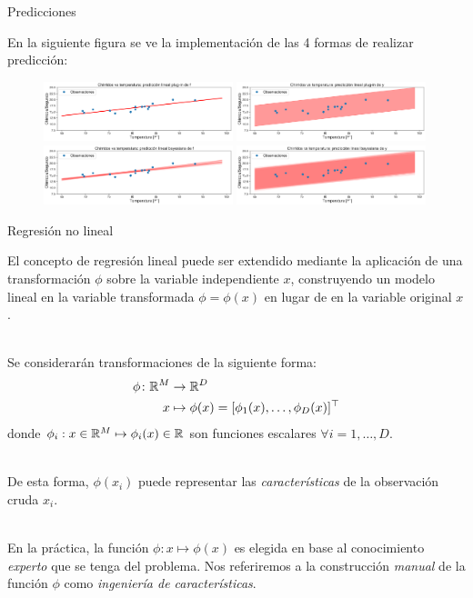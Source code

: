 \documentclass[9pt]{beamer}
\begin{document}
\begin{frame}{Predicciones}

En la siguiente figura se ve la implementación de las 4 formas de realizar predicción:

\begin{figure}[H]
	\centering
	\includegraphics[width=0.49\textwidth]{../img/cap2_chirridos_pred1}
	\includegraphics[width=0.49\textwidth]{../img/cap2_chirridos_pred2}
	\includegraphics[width=0.49\textwidth]{../img/cap2_chirridos_pred3}
	\includegraphics[width=0.49\textwidth]{../img/cap2_chirridos_pred4}
\end{figure}
	
\end{frame}

\begin{frame}{Regresión no lineal}

El concepto de regresión lineal puede ser extendido mediante la aplicación de una transformación $\phi$ sobre la variable independiente $x$, construyendo un modelo lineal en la variable transformada $\phi=\phi(x)$ en lugar de en la variable original $x$. \\~\ \pause

Se considerarán transformaciones de la siguiente forma:
\begin{align*}
  \phi \colon \mathbb{R}^M &\to \mathbb{R}^D\\
  x &\mapsto \phi(x)=[\phi_1(x),\ldots,\phi_D(x)]^\top
\end{align*}
donde $\phi_i: x\in\mathbb{R}^M \mapsto \phi_i(x)\in\mathbb{R}$ son funciones escalares $\forall i=1,\ldots,D$.\\~\ \pause

De esta forma, $\phi(x_i)$ puede representar las \emph{características} de la observación cruda $x_i$.\\~\ \pause

En la práctica, la función $\phi:x\mapsto\phi(x)$ es elegida en base  al conocimiento \emph{experto} que se tenga del problema. Nos referiremos a la construcción \emph{manual} de la función $\phi$ como \emph{ingeniería de características}.
	
\end{frame}
\end{document}
